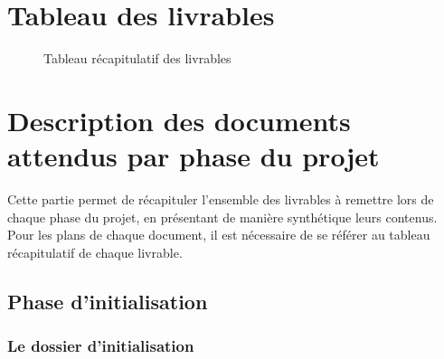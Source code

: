 \let\cleardoublepage\clearpage
\section{Tableau des livrables}

\vspace{-1cm}
\begin{figure}[H]
\noindent{}
\vspace{-3cm}
\caption{Tableau récapitulatif des livrables}
\end{figure}

\section{Description des documents attendus par phase du projet}

Cette partie permet de récapituler l’ensemble des livrables à remettre lors de chaque phase du projet, en présentant de manière synthétique leurs contenus. \\

Pour les plans de chaque document, il est nécessaire de se référer au tableau récapitulatif de chaque livrable.

\subsection{Phase d’initialisation}

\subsubsection{Le dossier d’initialisation}

